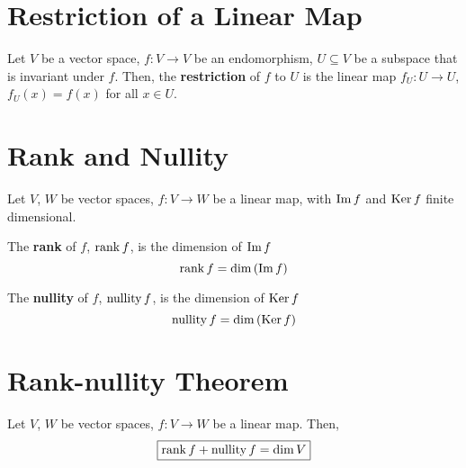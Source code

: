 \documentclass[letterpaper,12pt]{article}
\begin{document}
\section*{Restriction of a Linear Map}
\begin{definition}
Let $V$ be a vector space, $f: V \rightarrow V$ be an endomorphism, $U \subseteq V$ be a subspace that is invariant under $f$. Then, the \textbf{restriction} of $f$ to $U$ is the linear map $f_{U}: U \rightarrow U$, $f_{U}(x) = f(x)$ for all $x \in U$.
\end{definition}

\section*{Rank and Nullity}
Let $V$, $W$ be vector spaces, $f: V \rightarrow W$ be a linear map, with $\operatorname{Im}{f}$ and $\operatorname{Ker}{f}$ finite dimensional.
\begin{definition}
The \textbf{rank} of $f$, $\operatorname{rank}{f}$, is the dimension of $\operatorname{Im}{f}$
\begin{equation*}
    \operatorname{rank}{f} = \dim{(\operatorname{Im}{f})}
\end{equation*}
\end{definition}

\begin{definition}
The \textbf{nullity} of $f$, $\operatorname{nullity}{f}$, is the dimension of $\operatorname{Ker}{f}$
\begin{equation*}
    \operatorname{nullity}{f} = \dim{(\operatorname{Ker}{f})}
\end{equation*}
\end{definition}

\section*{Rank-nullity Theorem}
\begin{theorem}
Let $V$, $W$ be vector spaces, $f: V \rightarrow W$ be a linear map. Then,
\begin{equation*}
    \boxed{\operatorname{rank}{f} + \operatorname{nullity}{f} = \dim{V}}
\end{equation*}
\end{theorem}
\end{document}
